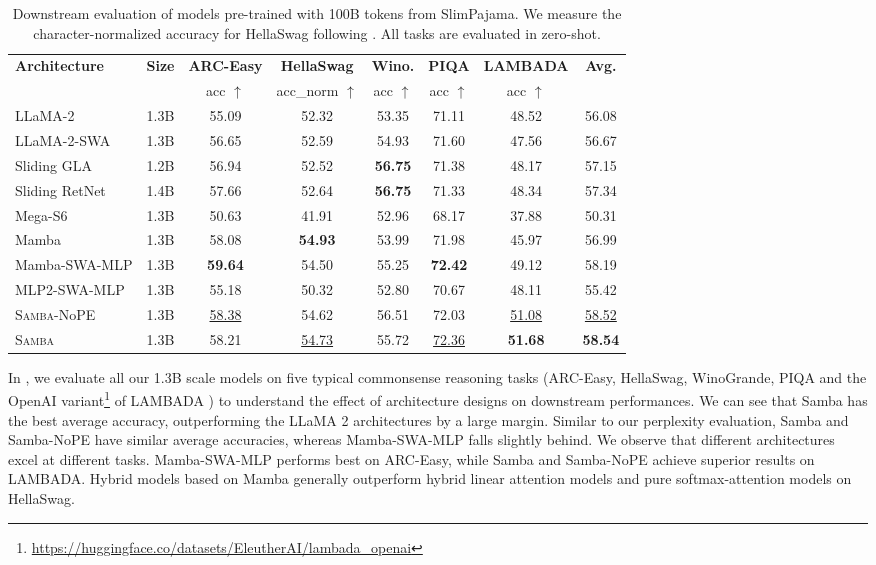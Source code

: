 \documentclass{article}
\begin{document}
\begin{table}[h]
\centering
\small

    \caption{ Downstream evaluation of models pre-trained with 100B tokens from SlimPajama. We measure the character-normalized accuracy for HellaSwag following \cite{gu2023mamba}. All tasks are evaluated in zero-shot.  }
    \vspace{-0.1cm}
    \label{tab:slim_down}
    \begin{tabular}{lc|ccccc|c}
\toprule
\multirow{2}{*}{\bf Architecture} & \multirow{2}{*}{\bf Size} &  \bf ARC-Easy & \bf HellaSwag & \bf Wino. & \bf PIQA & \bf  LAMBADA & \multirow{2}{*}{ \bf Avg.} \\
    &  & acc $\uparrow$ & acc\_norm $\uparrow$ & acc $\uparrow$ & acc $\uparrow$ & acc $\uparrow$ &  \\
\midrule
LLaMA-2 & 1.3B & 55.09 & 52.32 & 53.35 & 71.11 & 48.52 & 56.08 \\
LLaMA-2-SWA & 1.3B & 56.65 & 52.59 & 54.93 & 71.60 & 47.56 & 56.67 \\
Sliding GLA & 1.2B & 56.94 & 52.52 & \bf 56.75 & 71.38 & 48.17 & 57.15 \\
Sliding RetNet & 1.4B & 57.66 & 52.64 & \bf 56.75 & 71.33 & 48.34 & 57.34 \\
Mega-S6 & 1.3B & 50.63 & 41.91 & 52.96 & 68.17 & 37.88 & 50.31 \\
Mamba & 1.3B & 58.08 & \bf 54.93 & 53.99 & 71.98 & 45.97 & 56.99 \\
Mamba-SWA-MLP & 1.3B &\bf 59.64 & 54.50 & 55.25 & \bf 72.42 & 49.12 & 58.19 \\
MLP2-SWA-MLP & 1.3B & 55.18 & 50.32 & 52.80 & 70.67 & 48.11 & 55.42 \\
\textsc{Samba}-NoPE & 1.3B & \underline{58.38} & 54.62 & 56.51 & 72.03 & \underline{51.08} & \underline{58.52} \\
\textsc{Samba} & 1.3B & 58.21 & \underline{54.73} & 55.72 & \underline{72.36} & \bf 51.68 & \bf 58.54 \\
\bottomrule

    \end{tabular}

\end{table}

 In , we evaluate all our 1.3B scale models on five typical commonsense reasoning tasks (ARC-Easy, HellaSwag, WinoGrande, PIQA and the OpenAI variant\footnote{\url{https://huggingface.co/datasets/EleutherAI/lambada_openai}} of LAMBADA \citep{paperno2016lambada} ) to understand the effect of architecture designs on downstream performances. We can see that Samba has the best average accuracy, outperforming the LLaMA 2 architectures by a large margin. Similar to our perplexity evaluation, Samba and Samba-NoPE have similar average accuracies, whereas Mamba-SWA-MLP falls slightly behind. We observe that different architectures excel at different tasks. Mamba-SWA-MLP performs best on ARC-Easy, while Samba and Samba-NoPE achieve superior results on LAMBADA. Hybrid models based on Mamba generally outperform hybrid linear attention models and pure softmax-attention models on HellaSwag.
\end{document}
